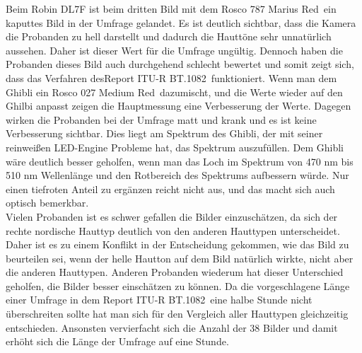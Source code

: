Beim Robin DL7F ist beim dritten Bild mit dem Rosco 787 \glqq Marius Red\grqq\ ein kaputtes Bild in der Umfrage gelandet. Es ist deutlich sichtbar, dass die Kamera die Probanden zu hell darstellt und dadurch die Hauttöne sehr unnatürlich aussehen. Daher ist dieser Wert für die Umfrage ungültig. Dennoch haben die Probanden dieses Bild auch durchgehend schlecht bewertet und somit zeigt sich, dass das Verfahren des\glqq Report ITU-R BT.1082\grqq\ funktioniert. 
Wenn man dem Ghibli ein Rosco 027 \glqq Medium Red\grqq\ dazumischt, und die Werte wieder auf den Ghilbi anpasst zeigen die Hauptmessung eine Verbesserung der Werte. Dagegen wirken die Probanden bei der Umfrage matt und krank und es ist keine Verbesserung sichtbar. Dies liegt am Spektrum des Ghibli, der mit seiner reinweißen LED-Engine Probleme hat, das Spektrum auszufüllen. Dem Ghibli wäre deutlich besser geholfen, wenn man das Loch im Spektrum von 470 nm bis 510 nm Wellenlänge und den Rotbereich des Spektrums aufbessern würde. Nur einen tiefroten Anteil zu ergänzen reicht nicht aus, und das macht sich auch optisch bemerkbar.\\
Vielen Probanden ist es schwer gefallen die Bilder einzuschätzen, da sich der rechte nordische Hauttyp deutlich von den anderen Hauttypen unterscheidet. Daher ist es zu einem Konflikt in der Entscheidung gekommen, wie das Bild zu beurteilen sei, wenn der helle Hautton auf dem Bild natürlich wirkte, nicht aber die anderen Hauttypen. Anderen Probanden wiederum hat dieser Unterschied geholfen, die Bilder besser einschätzen zu können. Da die vorgeschlagene Länge einer Umfrage in dem \glqq Report ITU-R BT.1082\grqq\ eine halbe Stunde nicht überschreiten sollte hat man sich für den Vergleich aller Hauttypen gleichzeitig entschieden. Ansonsten vervierfacht sich die Anzahl der 38 Bilder und damit erhöht sich die Länge der Umfrage auf eine Stunde. 




